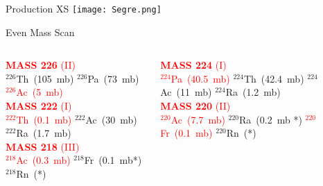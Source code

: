 \documentclass[10pt]{beamer}
\title{\normalsize }
\institute{}
\author{}
\date{}
\begin{document}
\frame{\titlepage}
\begin{frame}{Production XS}	
	\centering
	\texttt{[image: Segre.png]}

\end{frame}
\begin{frame}{Even Mass Scan}	
	\begin{columns}
		\begin{column}{0.5\textwidth}
			\begin{overlayarea}{\textwidth}{0.5\textheight}
				\centering
				\textcolor{red}{\textbf{MASS 226} (II)}\\
				{\footnotesize $^{226}$Th~(105~mb) $^{226}$Pa~(73~mb) \textcolor{red}{$^{226}$Ac~(5~mb)}}\\
				\vspace{0.05\textheight}
				\textcolor{red}{\textbf{MASS 222} (I)}\\
				{\footnotesize\textcolor{red}{$^{222}$Th~(0.1~mb)} $^{222}$Ac~(30~mb) $^{222}$Ra~(1.7~mb) }\\
				\vspace{0.05\textheight}
				\textcolor{red}{\textbf{MASS 218} (III)}\\
				{\footnotesize\textcolor{red}{$^{218}$Ac~(0.3~mb)} $^{218}$Fr~(0.1~mb*) $^{218}$Rn~(*) }
			\end{overlayarea}
		\end{column}
		\begin{column}{0.5\textwidth}
			\begin{overlayarea}{\textwidth}{0.5\textheight}
				\centering
				\textcolor{red}{\textbf{MASS 224} (I)}\\
				{\footnotesize \textcolor{red}{$^{224}$Pa~(40.5~mb)} $^{224}$Th~(42.4~mb) $^{224}$Ac~(11~mb) $^{224}$Ra~(1.2~mb)}\\
				\vspace{0.05\textheight}
				\textcolor{red}{\textbf{MASS 220} (II)}\\
				{\footnotesize\textcolor{red}{$^{220}$Ac~(7.7~mb)} $^{220}$Ra~(0.2~mb *) \textcolor{red}{$^{220}$Fr~(0.1~mb)} $^{220}$Rn~(*)}\\
			\end{overlayarea}
		\end{column}
	\end{columns}	
\end{frame}
\end{document}

